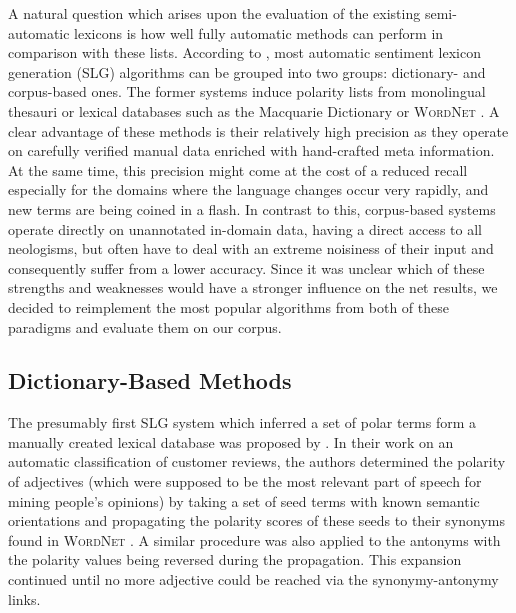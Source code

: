 A natural question which arises upon the evaluation of the existing
semi-automatic lexicons is how well fully automatic methods can
perform in comparison with these lists.  According to
\citet[p. 79]{Liu:12}, most automatic sentiment lexicon generation
(SLG) algorithms can be grouped into two groups: dictionary- and
corpus-based ones.  The former systems induce polarity lists from
monolingual thesauri or lexical databases such as the Macquarie
Dictionary \cite{Bernard:86} or \textsc{WordNet} \cite{Miller:95}.  A
clear advantage of these methods is their relatively high precision as
they operate on carefully verified manual data enriched with
hand-crafted meta information.  At the same time, this precision might
come at the cost of a reduced recall especially for the domains where
the language changes occur very rapidly, and new terms are being
coined in a flash.  In contrast to this, corpus-based systems operate
directly on unannotated in-domain data, having a direct access to all
neologisms, but often have to deal with an extreme noisiness of their
input and consequently suffer from a lower accuracy.  Since it was
unclear which of these strengths and weaknesses would have a stronger
influence on the net results, we decided to reimplement the most
popular algorithms from both of these paradigms and evaluate them on
our corpus.

\subsection{Dictionary-Based Methods}

The presumably first SLG system which inferred a set of polar terms
form a manually created lexical database was proposed by
\citet{Hu:04}.  In their work on an automatic classification of
customer reviews, the authors determined the polarity of adjectives
(which were supposed to be the most relevant part of speech for mining
people's opinions) by taking a set of seed terms with known semantic
orientations and propagating the polarity scores of these seeds to
their synonyms found in \textsc{WordNet} \cite{Miller:95}.  A similar
procedure was also applied to the antonyms with the polarity values
being reversed during the propagation.  This expansion continued until
no more adjective could be reached via the synonymy-antonymy links.

